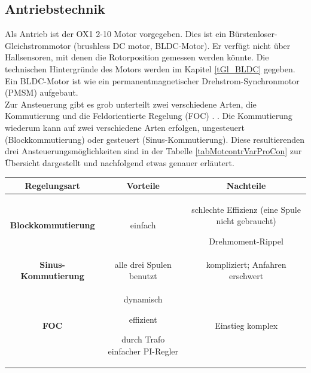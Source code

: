 \subsection*{Antriebstechnik}
Als Antrieb ist der OX1 2-10 Motor vorgegeben. Dies ist ein Bürstenloser-Gleichstrommotor (brushless DC motor, BLDC-Motor). Er verfügt nicht über Hallsensoren, mit denen die Rotorposition gemessen werden könnte. Die technischen Hintergründe des Motors werden im Kapitel \ref{tGl_BLDC} gegeben. Ein BLDC-Motor ist wie ein permanentmagnetischer Drehstrom-Synchronmotor (PMSM) aufgebaut.\\
Zur Ansteuerung gibt es grob unterteilt zwei verschiedene Arten, die Kommutierung und die Feldorientierte Regelung (FOC) \cite{BLDC}. . Die Kommutierung wiederum kann auf zwei verschiedene Arten erfolgen, ungesteuert (Blockkommutierung) oder gesteuert (Sinus-Kommutierung). Diese resultierenden drei Ansteuerungsmöglichkeiten sind in der Tabelle \ref{tabMotcontrVarProCon} zur Übersicht dargestellt und nachfolgend etwas genauer erläutert. 
\begin{center}
	\begin{tabular}{|c|c|c|}
		\hline 
		\textbf{Regelungsart} & \textbf{Vorteile} & \textbf{Nachteile} \\ 
		\hline 
		\textbf{Blockkommutierung} & einfach & schlechte Effizienz (eine Spule nicht gebraucht) 
		
		Drehmoment-Rippel \\
		\hline 
		\textbf{Sinus-Kommutierung} & alle drei Spulen benutzt & kompliziert; Anfahren erschwert \\ 
		\hline 
		\textbf{FOC} & dynamisch 
		
		effizient 
		
		durch Trafo einfacher PI-Regler & Einstieg komplex \\ 
		\hline 
	\end{tabular} 
	\label{tabMotcontrVarProCon}
\end{center}


